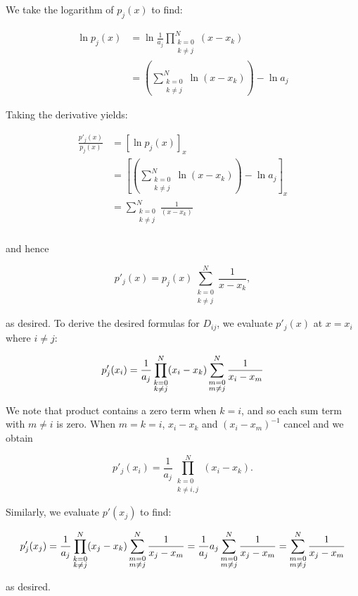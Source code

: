 \begin{solution}
  We take the logarithm of $p_j(x)$ to find:

  \begin{align*}
    \ln{p_j(x)} &= \ln{\frac{1}{a_j} \prod\limits_{\substack{k=0 \\ k \neq j}}^{N} (x - x_k)} \\
                &= \left( \sum\limits_{\substack{k=0 \\ k \neq j}}^{N} \ln{(x - x_k)} \right) - \ln{a_j} 
  \end{align*}

  \pagebreak
  Taking the derivative yields:

  \begin{align*}
    \frac{p'_j(x)}{p_j(x)} &= \left[ \ln{p_j(x)} \right]_x  \\
                           &= \left[ \left( \sum\limits_{\substack{k=0 \\ k \neq j}}^{N} \ln{(x - x_k)} \right) - \ln{a_j} \right]_x \\
                           &= \sum\limits_{\substack{k=0 \\ k \neq j}}^{N} \frac{1}{(x - x_k)} \\
  \end{align*}

  and hence

  $$
    p'_j(x) = p_j(x) \sum\limits_{\substack{k=0 \\ k \neq j}}^N \frac{1}{x - x_k},
  $$

  as desired. To derive the desired formulas for $D_{ij}$, we evaluate $p'_j(x)$ at $x = x_i$ where $i \neq j$:

  $$
    p'_j(x_i) = \frac{1}{a_j} \prod\limits_{\substack{k=0 \\ k \neq j}}^{N}(x_i - x_k) \sum\limits_{\substack{m=0 \\ m \neq j}}^N \frac{1}{x_i - x_m} \\
  $$

  We note that product contains a zero term when $k = i$, and so each sum term with $m \neq i$ is zero. When 
  $m = k = i$, $x_i - x_k$ and $(x_i - x_m)^{-1}$ cancel and we obtain

  $$
    p'_j(x_i) = \frac{1}{a_j} \prod\limits_{\substack{k=0 \\ k \neq i,j}}^{N}(x_i - x_k).
  $$

  Similarly, we evaluate $p'(x_j)$ to find:

  $$
    p'_j(x_j) = \frac{1}{a_j} \prod\limits_{\substack{k=0 \\ k \neq j}}^{N}(x_j - x_k) \sum\limits_{\substack{m=0 \\ m \neq j}}^N \frac{1}{x_j - x_m} \\
              = \frac{1}{a_j} a_j \sum\limits_{\substack{m=0 \\ m \neq j}}^N \frac{1}{x_j - x_m} \\
              = \sum\limits_{\substack{m=0 \\ m \neq j}}^N \frac{1}{x_j - x_m}
  $$

  as desired.

\end{solution}